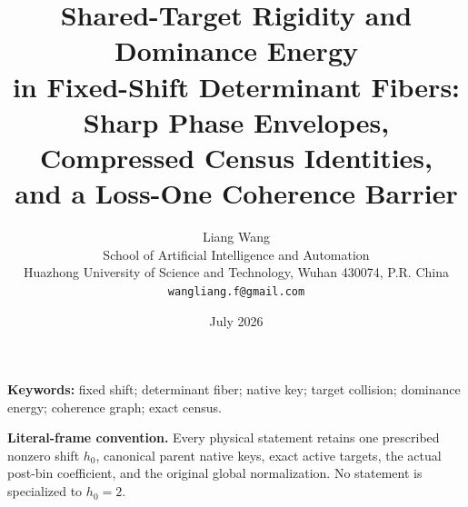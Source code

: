 \documentclass[11pt]{article}
\title{\textbf{Shared-Target Rigidity and Dominance Energy}\\
\textbf{in Fixed-Shift Determinant Fibers:}\\
Sharp Phase Envelopes, Compressed Census Identities,\\
and a Loss-One Coherence Barrier}
\author{Liang Wang\\
School of Artificial Intelligence and Automation\\
Huazhong University of Science and Technology, Wuhan 430074, P.R. China\\
\texttt{wangliang.f@gmail.com}}
\date{July 2026}
\theoremstyle{definition}
\theoremstyle{remark}
\begin{document}
\maketitle



\noindent\textbf{Keywords:}
fixed shift; determinant fiber; native key; target collision;
dominance energy; coherence graph; exact census.

\medskip
\noindent\textbf{Literal-frame convention.}
Every physical statement retains one prescribed nonzero shift
\(h_0\), canonical parent native keys, exact active targets, the
actual post-bin coefficient, and the original global normalization.
No statement is specialized to \(h_0=2\).










\begingroup
\footnotesize
\raggedright


\endgroup
\end{document}
